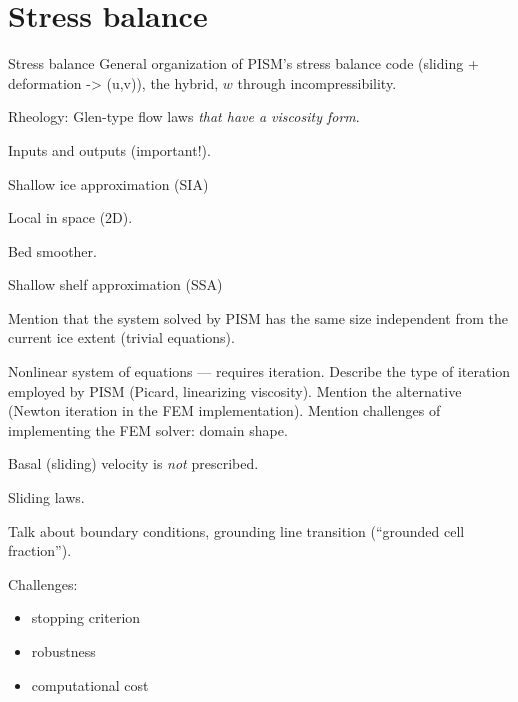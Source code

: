 \documentclass[notes,intlimits]{beamer}
\begin{document}

\section{Stress balance}
\label{sec:stress-balance}

\begin{frame}{Stress balance}
  General organization of PISM's stress balance code (sliding +
  deformation -> (u,v)), the hybrid, $w$ through incompressibility.

  Rheology: Glen-type flow laws \emph{that have a viscosity form}.

  Inputs and outputs (important!).
\end{frame}


\begin{frame}{Shallow ice approximation (SIA)}

  Local in space (2D).

  Bed smoother.
\end{frame}

\begin{frame}{Shallow shelf approximation (SSA)}

  Mention that the system solved by PISM has the same size independent
  from the current ice extent (trivial equations).

  Nonlinear system of equations --- requires iteration. Describe the
  type of iteration employed by PISM (Picard, linearizing viscosity).
  Mention the alternative (Newton iteration in the FEM
  implementation). Mention challenges of implementing the FEM solver:
  domain shape.

  Basal (sliding) velocity is \emph{not} prescribed.

  Sliding laws.

  Talk about boundary conditions, grounding line transition
  (``grounded cell fraction'').

  Challenges:
  \begin{itemize}
  \item stopping criterion
  \item robustness
  \item computational cost
  \end{itemize}
\end{frame}
\end{document}
